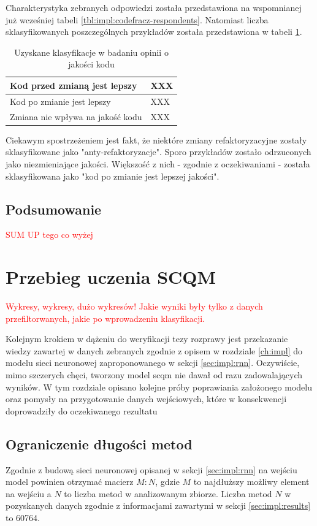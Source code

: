 \documentclass[12pt]{report}
\begin{document}
Charakterystyka zebranych odpowiedzi została przedstawiona na wspomnianej już wcześniej tabeli \ref{tbl:impl:codefracz-respondents}. Natomiast liczba sklasyfikowanych poszczególnych przykładów została przedstawiona w tabeli \ref{tbl:impl:codefracz-results}.

\begin{table}[t]
\caption{Uzyskane klasyfikacje w badaniu opinii o jakości kodu}
\label{tbl:impl:codefracz-results}
\begin{tabular}{|l|l|}
  \hline 
  Kod przed zmianą jest lepszy & XXX \\ \hline
  Kod po zmianie jest lepszy & XXX \\ \hline
  Zmiana nie wpływa na jakość kodu & XXX \\ \hline
\end{tabular} 
\end{table}

Ciekawym spostrzeżeniem jest fakt, że niektóre zmiany refaktoryzacyjne zostały sklasyfikowane jako "anty-refaktoryzacje". Sporo przykładów zostało odrzuconych jako niezmieniające jakości. Większość z nich - zgodnie z oczekiwaniami - została sklasyfikowana jako "kod po zmianie jest lepszej jakości".

\section{Podsumowanie}
\textcolor{red}{SUM UP tego co wyżej}

\chapter{Przebieg uczenia SCQM}
\label{ch:learn}

\textcolor{red}{Wykresy, wykresy, dużo wykresów! Jakie wyniki były tylko z danych przefiltorwanych, jakie po wprowadzeniu klasyfikacji.}

Kolejnym krokiem w dążeniu do weryfikacji tezy rozprawy jest przekazanie wiedzy zawartej w danych zebranych zgodnie z opisem w rozdziale \ref{ch:impl} do modelu sieci neuronowej zaproponowanego w sekcji \ref{sec:impl:rnn}. Oczywiście, mimo szczerych chęci, tworzony model \gls{scqm} nie dawał od razu zadowalających wyników. W tym rozdziale opisano kolejne próby poprawiania założonego modelu oraz pomysły na przygotowanie danych wejściowych, które w konsekwencji doprowadziły do oczekiwanego rezultatu

\section{Ograniczenie długości metod}
\label{sec:learn:len-limit}
Zgodnie z budową sieci neuronowej opisanej w sekcji \ref{sec:impl:rnn} na wejściu model powinien otrzymać macierz $M:N$, gdzie $M$ to najdłuższy możliwy element na wejściu a $N$ to liczba metod w analizowanym zbiorze. Liczba metod $N$ w pozyskanych danych zgodnie z informacjami zawartymi w sekcji \ref{sec:impl:results} to 60764.
\end{document}

